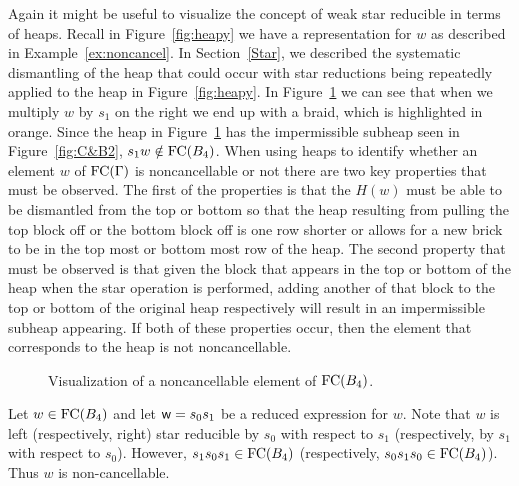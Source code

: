 Again it might be useful to visualize the concept of weak star reducible in terms of heaps. Recall in Figure~\ref{fig:heapy} we have a representation for $w$ as described in Example~\ref{ex:noncancel}. In Section~\ref{Star}, we described the systematic dismantling of the heap that could occur with star reductions being repeatedly applied to the heap in Figure~\ref{fig:heapy}. In Figure~\ref{fig:noncancel} we can see that when we multiply $w$ by $s_1$ on the right we end up with a braid, which is  highlighted in orange. Since the heap in Figure~\ref{fig:noncancel} has the impermissible subheap seen in Figure~\ref{fig:C&B2}, $s_1w \notin \mathrm{FC}(B_4)$.  When using heaps to identify whether an element $w$ of $\mathrm{FC}(\Gamma)$ is noncancellable or not there are two key properties that must be observed. The first of the properties is that the $H(w)$ must be able to be dismantled from the top or bottom so that the heap resulting from pulling the top block off or the bottom block off is one row shorter or allows for a new brick to be in the top most or bottom most row of the heap. The second property that must be observed is that given the block that appears in the top or bottom of the heap when the star operation is performed, adding another of that block to the top or bottom of the original heap respectively will result in an impermissible subheap appearing. If both of these properties occur, then the element that corresponds to the heap is not noncancellable.

\begin{figure*}[h!] \centering
{}
\caption{Visualization of a noncancellable element of $\mathrm{FC}(B_4)$.} \label{fig:noncancel}
\end{figure*}

\begin{example}
Let $w \in \mathrm{FC}(B_4)$ and let $\mathsf{w}=s_0s_1$ be a reduced expression for $w$. Note that $w$ is left (respectively, right) star reducible by $s_0$ with respect to $s_1$ (respectively, by $s_1$ with respect to $s_0$). However, $s_1s_0s_1 \in \mathrm{FC}(B_4)$ (respectively, $s_0s_1s_0 \in \mathrm{FC}(B_4)$). Thus $w$ is non-cancellable.
\end{example}

